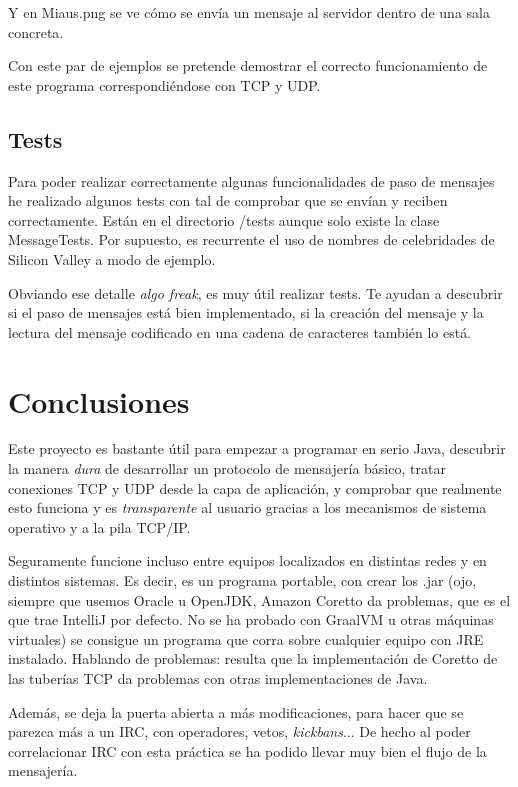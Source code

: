 \documentclass{article}
\begin{document}
Y en Miaus.png se ve cómo se envía un mensaje al servidor dentro de una sala concreta.

Con este par de ejemplos se pretende demostrar el correcto funcionamiento de este programa correspondiéndose con TCP y UDP.


\subsection{Tests}

Para poder realizar correctamente algunas funcionalidades de paso de mensajes he realizado algunos tests con tal de comprobar que se envían y reciben correctamente. Están en el directorio /tests aunque solo existe la clase MessageTests. Por supuesto, es recurrente el uso de nombres de celebridades de Silicon Valley a modo de ejemplo.

Obviando ese detalle \textit{algo freak}, es muy útil realizar tests. Te ayudan a descubrir si el paso de mensajes está bien implementado, si la creación del mensaje y la lectura del mensaje codificado en una cadena de caracteres también lo está.

\section{Conclusiones}

Este proyecto es bastante útil para empezar a programar en serio Java, descubrir la manera \textit{dura} de desarrollar un protocolo de mensajería básico, tratar conexiones TCP y UDP desde la capa de aplicación, y comprobar que realmente esto funciona y es \textit{transparente} al usuario gracias a los mecanismos de sistema operativo y a la pila TCP/IP.

Seguramente funcione incluso entre equipos localizados en distintas redes y en distintos sistemas. Es decir, es un programa portable, con crear los .jar (ojo, siempre que usemos Oracle u OpenJDK, Amazon Coretto da problemas, que es el que trae IntelliJ por defecto. No se ha probado con GraalVM u otras máquinas virtuales) se consigue un programa que corra sobre cualquier equipo con JRE instalado. Hablando de problemas: resulta que la implementación de Coretto de las tuberías TCP da problemas con otras implementaciones de Java.

Además, se deja la puerta abierta a más modificaciones, para hacer que se parezca más a un IRC, con operadores, vetos, \textit{kickbans}... De hecho al poder correlacionar IRC con esta práctica se ha podido llevar muy bien el flujo de la mensajería.
\end{document}
